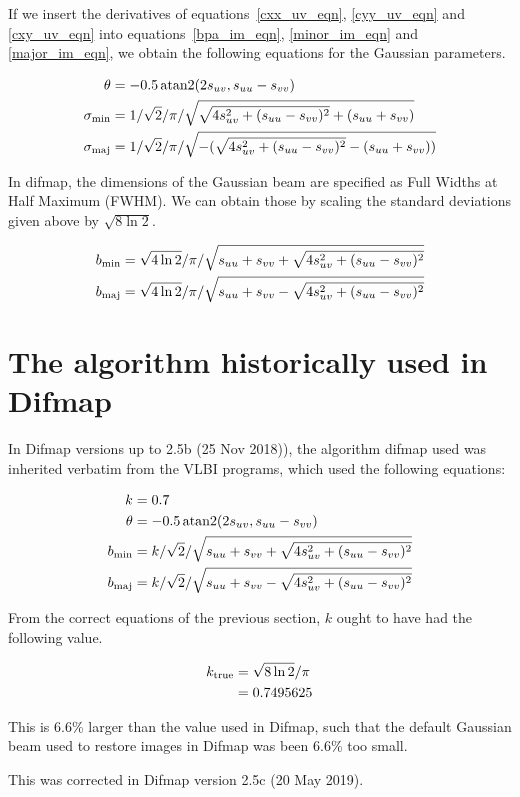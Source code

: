 \documentclass[11pt]{article}
\newcommand{\bpa}{\theta}
\newcommand{\minor}{\sigma_{\mbox{\scriptsize min}}}
\newcommand{\major}{\sigma_{\mbox{\scriptsize maj}}}
\newcommand{\minorfwhm}{b_{\mbox{\scriptsize min}}}
\newcommand{\majorfwhm}{b_{\mbox{\scriptsize maj}}}
\newcommand{\arctantwo}[2]{\mbox{\,atan2}( #1, #2 )}
\newcommand{\suu}{s_{uu}}
\newcommand{\svv}{s_{vv}}
\newcommand{\suv}{s_{uv}}
\begin{document}
If we insert the derivatives of equations~\ref{cxx_uv_eqn},
\ref{cyy_uv_eqn} and \ref{cxy_uv_eqn} into equations~\ref{bpa_im_eqn},
\ref{minor_im_eqn} and \ref{major_im_eqn}, we obtain the following
equations for the Gaussian parameters.

\begin{align}
  \bpa &= -0.5  \arctantwo{2 \suv}{\suu-\svv}\\
  \minor &= 1 / \sqrt{2} / \pi / \sqrt{\sqrt{4 \suv^2 + (\suu-\svv)^2} + (\suu+\svv)}\\
  \major &=  1 / \sqrt{2} / \pi / \sqrt{-(\sqrt{4 \suv^2 + (\suu-\svv)^2} - (\suu+\svv))}
\end{align}

In difmap, the dimensions of the Gaussian beam are specified as Full
Widths at Half Maximum (FWHM). We can obtain those by scaling the
standard deviations given above by $\sqrt{8 \ln{2}}$.

\begin{align}
  \minorfwhm &= \sqrt{4 \ln{2}}/\pi / \sqrt{\suu+\svv + \sqrt{4 \suv^2
      + (\suu-\svv)^2}} \\
  \majorfwhm &= \sqrt{4 \ln{2}}/\pi / \sqrt{\suu+\svv - \sqrt{4
         \suv^2 + (\suu-\svv)^2}}
\end{align}

\section{The algorithm historically used in Difmap}

In Difmap versions up to 2.5b (25 Nov 2018)), the algorithm difmap
used was inherited verbatim from the VLBI programs, which used the
following equations:

\begin{align}
  k &= 0.7 \\
  \bpa &= -0.5  \arctantwo{2 \suv}{\suu - \svv} \\
  \minorfwhm &= k/\sqrt{2} / \sqrt{\suu+\svv + \sqrt{4 \suv^2 + (\suu-\svv)^2}} \\
  \majorfwhm &= k/\sqrt{2} / \sqrt{\suu+\svv - \sqrt{4 \suv^2 + (\suu-\svv)^2}}
\end{align}

From the correct equations of the previous section, $k$ ought to have
had the following value.

\begin{align}
  k_{\mbox{\scriptsize true}} &= \sqrt{8 \ln{2}}/\pi \\
               &= 0.7495625
\end{align}

This is 6.6\% larger than the value used in Difmap, such that the
default Gaussian beam used to restore images in Difmap was been 6.6\%
too small.

This was corrected in Difmap version 2.5c (20 May 2019).
\end{document}
